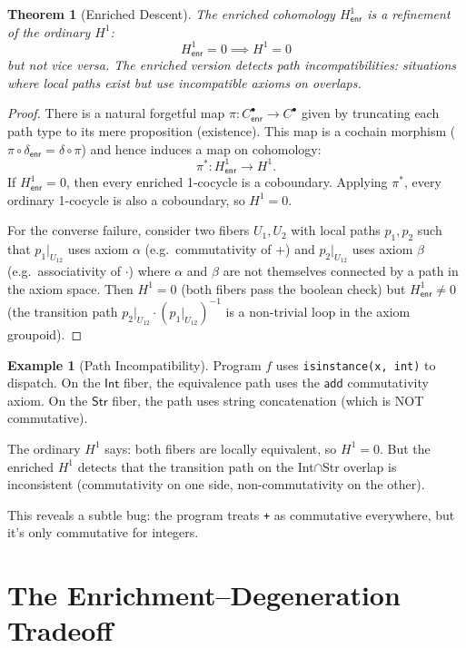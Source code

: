 \documentclass[11pt,a4paper]{report}
\theoremstyle{definition}
\newtheorem{example}[definition]{Example}
\theoremstyle{plain}
\newtheorem{theorem}[definition]{Theorem}
\newcommand{\Hone}{H^1}
\begin{document}
\begin{theorem}[Enriched Descent]
\label{thm:enriched-descent}
The enriched cohomology $\Hone_\mathsf{enr}$ is a refinement of the
ordinary $\Hone$:
\[
  \Hone_\mathsf{enr} = 0 \implies \Hone = 0
\]
but not vice versa.  The enriched version detects \emph{path
incompatibilities}: situations where local paths exist but use
incompatible axioms on overlaps.
\end{theorem}

\begin{proof}
There is a natural forgetful map
$\pi : C^\bullet_\mathsf{enr} \to C^\bullet$ given by truncating
each path type to its mere proposition (existence).  This map is a
cochain morphism ($\pi \circ \delta_\mathsf{enr} =
\delta \circ \pi$) and hence induces a map on cohomology:
\[
  \pi^* : \Hone_\mathsf{enr} \to \Hone.
\]
If $\Hone_\mathsf{enr} = 0$, then every enriched 1-cocycle is a
coboundary.  Applying $\pi^*$, every ordinary 1-cocycle is also a
coboundary, so $\Hone = 0$.

For the converse failure, consider two fibers $U_1, U_2$ with
local paths $p_1, p_2$ such that $p_1|_{U_{12}}$ uses axiom
$\alpha$ (e.g.\ commutativity of $+$) and $p_2|_{U_{12}}$ uses
axiom $\beta$ (e.g.\ associativity of $\cdot$) where
$\alpha$ and $\beta$ are not themselves connected by a path in the
axiom space.  Then $\Hone = 0$ (both fibers pass the boolean check)
but $\Hone_\mathsf{enr} \neq 0$ (the transition path
$p_2|_{U_{12}} \cdot (p_1|_{U_{12}})^{-1}$ is a non-trivial
loop in the axiom groupoid).
\end{proof}

\begin{example}[Path Incompatibility]
Program $f$ uses \texttt{isinstance(x, int)} to dispatch.  On the
$\mathsf{Int}$ fiber, the equivalence path uses the $\mathsf{add}$
commutativity axiom.  On the $\mathsf{Str}$ fiber, the path uses
string concatenation (which is NOT commutative).

The ordinary $\Hone$ says: both fibers are locally equivalent, so
$\Hone = 0$.  But the enriched $\Hone$ detects that the transition
path on the Int$\cap$Str overlap is inconsistent (commutativity on
one side, non-commutativity on the other).

This reveals a subtle bug: the program treats \texttt{+} as
commutative everywhere, but it's only commutative for integers.
\end{example}

\section{The Enrichment--Degeneration Tradeoff}
\end{document}
